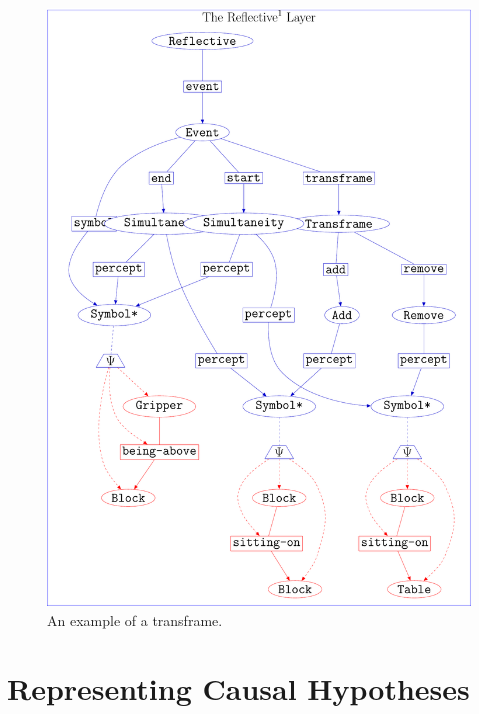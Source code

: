 \begin{figure}
\center
\includegraphics[width=12cm]{gfx/example_transframe}
\caption[An example of a transframe.]{An example of a transframe.}
\label{figure:example_transframe}
\end{figure}


\section{Representing Causal Hypotheses}

